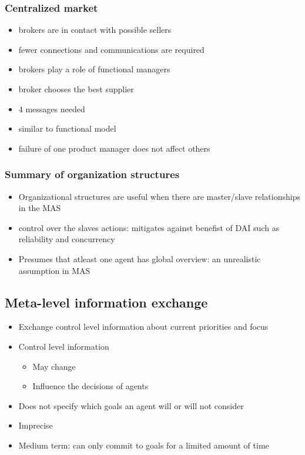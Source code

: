 \subsubsection{Centralized market}
\missingfigure{}
\begin{itemize}
\item brokers are in contact with possible sellers
\item fewer connections and communications are required
\item brokers play a role of functional managers
\item broker chooses the best supplier
\item 4 messages needed
\item similar to functional model
\item failure of one product manager does not affect others
\end{itemize}
\subsubsection{Summary of organization structures}
\begin{itemize}
\item Organizational structures are useful when there are master/slave relationships in the MAS
\item control over the slaves actions: mitigates against benefist of DAI such as reliability and concurrency
\item Presumes that atleast one agent has global overview: an unrealistic assumption in MAS
\end{itemize}
\subsection{Meta-level information exchange}

\begin{itemize}
\item Exchange control level information about current priorities and focus
\item Control level information
\begin{itemize}
\item May change
\item Influence the decisions of agents
\end{itemize}
\item Does not specify which goals an agent will or will not consider
\item Imprecise
\item Medium term: can only commit to goals for a limited amount of time
\end{itemize}


